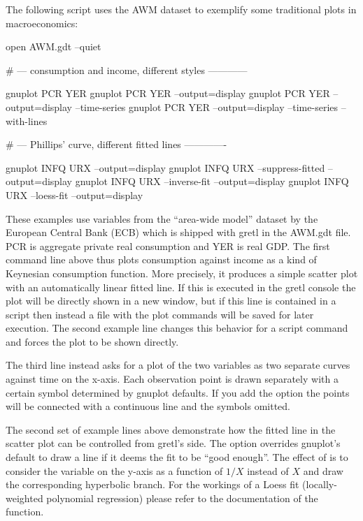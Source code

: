 The following script uses the AWM dataset to exemplify some
traditional plots in macroeconomics:

\begin{scode}
open AWM.gdt --quiet

# --- consumption and income, different styles ------------

gnuplot PCR YER
gnuplot PCR YER --output=display
gnuplot PCR YER --output=display --time-series
gnuplot PCR YER --output=display --time-series --with-lines

# --- Phillips' curve, different fitted lines -------------

gnuplot INFQ URX --output=display
gnuplot INFQ URX --suppress-fitted --output=display
gnuplot INFQ URX --inverse-fit --output=display
gnuplot INFQ URX --loess-fit --output=display
\end{scode}

These examples use variables from the ``area-wide model'' dataset by the 
European Central Bank (ECB) which is shipped with gretl in the AWM.gdt file.
PCR is aggregate private real consumption and YER is real GDP. The first command 
line above thus plots consumption against income as a kind of Keynesian 
consumption function. More precisely, it produces a simple scatter plot with
an automatically linear fitted line. If this is executed in the gretl console the plot
will be directly shown in a new window, but if this line is contained in a script then instead 
a file with the plot commands will be saved for later execution.
The second example line changes this behavior for a script command and forces the
plot to be shown directly. 

The third line instead asks for a plot of the two variables as two separate curves 
against time on the x-axis. Each observation point is drawn separately with a certain 
symbol determined by gnuplot defaults. If you add the option  
the points will be connected with a continuous line and the symbols omitted.

The second set of example lines above demonstrate how the fitted line in the 
scatter plot can be controlled from gretl's side. The option 
overrides gnuplot's default to draw a line if it deems the fit to be ``good enough''. The 
effect of  is to consider the variable on the y-axis as a function of 
$1/X$ instead of $X$ and draw the corresponding hyperbolic branch. For the workings
of a Loess fit (locally-weighted polynomial regression) please refer to the documentation 
of the  function.

